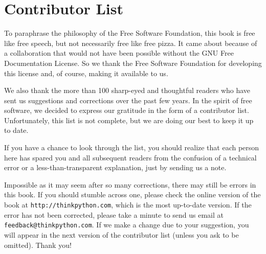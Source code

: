 


\chapter{Contributor List}

To paraphrase the philosophy of the Free Software Foundation, this
book is free like free speech, but not necessarily free like free
pizza.  It came about because of a collaboration that would not have
been possible without the GNU Free Documentation License.  So we
thank the Free Software Foundation for developing this license
and, of course, making it available to us.

We also thank the more than 100 sharp-eyed and
thoughtful readers who have sent us suggestions and corrections over
the past few years.  In the spirit of free software, we decided to
express our gratitude in the form of a contributor list.  Unfortunately,
this list is not complete, but we are doing our best to keep it
up to date.

If you have a chance to look through the list, you should
realize that each person here has spared you and all subsequent
readers from the confusion of a technical error or a
less-than-transparent explanation, just by sending us a note.

Impossible as it may seem after so many corrections, there may still
be errors in this book.  If you should stumble across one, please
check the online version of the book at {\tt http://thinkpython.com},
which is the most up-to-date version.  If the error has not been
corrected, please take a minute to send us email at {\tt
feedback@thinkpython.com}.  If we make a change due to your
suggestion, you will appear in the next version of the contributor
list (unless you ask to be omitted).  Thank you!


